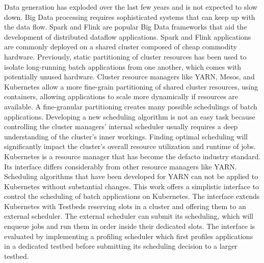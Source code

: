 Data generation has exploded over the last few years and is not expected to slow down. Big Data processing requires sophisticated systems that can keep up with the data flow. Spark and Flink are popular Big Data frameworks that aid the development of distributed dataflow applications. Spark and Flink applications are commonly deployed on a shared cluster composed of cheap commodity hardware. Previously, static partitioning of cluster resources has been used to isolate long-running batch applications from one another, which comes with potentially unused hardware. Cluster resource managers like YARN, Mesos, and Kubernetes allow a more fine-grain partitioning of shared cluster resources, using containers, allowing applications to scale more dynamically if resources are available. A fine-granular partitioning creates many possible schedulings of batch applications. Developing a new scheduling algorithm is not an easy task because controlling the cluster managers' internal scheduler usually requires a deep understanding of the cluster's inner workings. Finding optimal scheduling will significantly impact the cluster's overall resource utilization and runtime of jobs. Kubernetes is a resource manager that has become the defacto industry standard. Its interface differs considerably from other resource managers like YARN. Scheduling algorithms that have been developed for YARN can not be applied to Kubernetes without substantial changes. This work offers a simplistic interface to control the scheduling of batch applications on Kubernetes. The interface extends Kubernetes with Testbeds reserving slots in a cluster and offering them to an external scheduler. The external scheduler can submit its scheduling, which will enqueue jobs and run them in order inside their dedicated slots. The interface is evaluated by implementing a profiling scheduler which first profiles applications in a dedicated testbed before submitting its scheduling decision to a larger testbed.